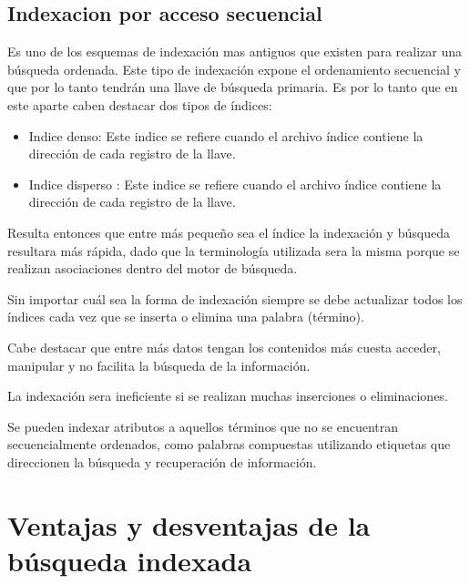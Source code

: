 \documentclass[11pt,a4paper]{article}
\begin{document}
\subsection{Indexacion por acceso secuencial}
Es uno de los esquemas de indexación mas antiguos que existen para realizar una búsqueda ordenada. Este tipo de indexación expone el ordenamiento secuencial y que por lo tanto tendrán una llave de búsqueda primaria. Es por lo tanto que en este aparte caben destacar dos tipos de índices:

\newpage

\begin{itemize}
\item Indice denso: Este indice se refiere cuando el archivo índice contiene la dirección de cada
registro de la llave.
\item Indice disperso : Este indice se refiere cuando el archivo índice contiene la dirección de cada registro de la llave.
\end{itemize}

Resulta entonces que entre más pequeño sea el índice la indexación y búsqueda resultara más rápida, dado que la terminología utilizada sera la misma porque se realizan asociaciones dentro del motor de búsqueda. 

Sin importar cuál sea la forma de indexación siempre se debe actualizar todos los índices cada vez que se inserta o elimina una palabra (término).

Cabe destacar que entre más datos tengan los contenidos más cuesta acceder, manipular y no facilita la búsqueda de la información.

La indexación sera ineficiente si se realizan muchas inserciones o eliminaciones.

Se pueden indexar atributos a aquellos términos que no se encuentran secuencialmente ordenados, como palabras compuestas utilizando etiquetas que direccionen la búsqueda y recuperación de información.

\section{Ventajas y desventajas de la búsqueda indexada}
\end{document}
